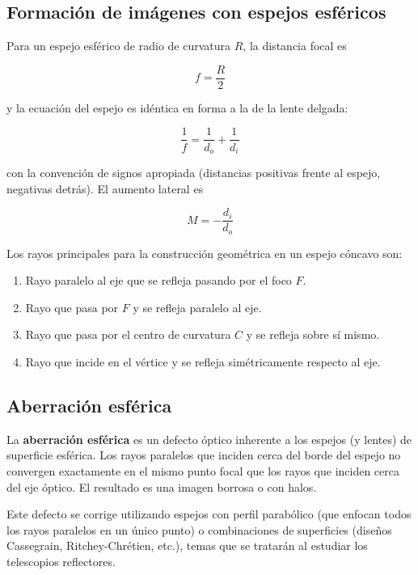 

\subsection{Formación de imágenes con espejos esféricos}

Para un espejo esférico de radio de curvatura $R$, la distancia focal es

$$f = \frac{R}{2}$$

y la ecuación del espejo es idéntica en forma a la de la lente delgada:

$$\frac{1}{f} = \frac{1}{d_o} + \frac{1}{d_i}$$

con la convención de signos apropiada (distancias positivas frente al espejo, negativas detrás). El aumento lateral es

$$M = -\frac{d_i}{d_o}$$

Los rayos principales para la construcción geométrica en un espejo cóncavo son:
\begin{enumerate}
    \item Rayo paralelo al eje que se refleja pasando por el foco $F$.
    \item Rayo que pasa por $F$ y se refleja paralelo al eje.
    \item Rayo que pasa por el centro de curvatura $C$ y se refleja sobre sí mismo.
    \item Rayo que incide en el vértice y se refleja simétricamente respecto al eje.
\end{enumerate}



\subsection{Aberración esférica}

La \textbf{aberración esférica} es un defecto óptico inherente a los espejos (y lentes) de superficie esférica. Los rayos paralelos que inciden cerca del borde del espejo no convergen exactamente en el mismo punto focal que los rayos que inciden cerca del eje óptico. El resultado es una imagen borrosa o con halos.



Este defecto se corrige utilizando espejos con perfil parabólico (que enfocan todos los rayos paralelos en un único punto) o combinaciones de superficies (diseños Cassegrain, Ritchey-Chrétien, etc.), temas que se tratarán al estudiar los telescopios reflectores.